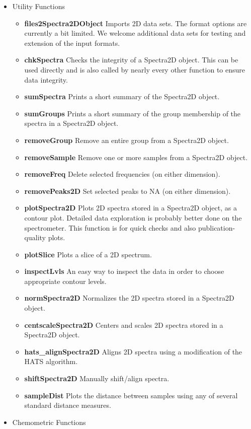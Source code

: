 \documentclass[10pt,twocolumn,twoside,]{pinp}
\providecommand{\tightlist}{%
  \setlength{\itemsep}{0pt}\setlength{\parskip}{0pt}}
\begin{document}
\begin{itemize}
\tightlist
\item
  Utility Functions

  \begin{itemize}
  \tightlist
  \item
    \textbf{files2Spectra2DObject} Imports 2D data sets. The format
    options are currently a bit limited. We welcome additional data sets
    for testing and extension of the input formats.
  \item
    \textbf{chkSpectra} Checks the integrity of a Spectra2D object. This
    can be used directly and is also called by nearly every other
    function to ensure data integrity.
  \item
    \textbf{sumSpectra} Prints a short summary of the Spectra2D object.
  \item
    \textbf{sumGroups} Prints a short summary of the group membership of
    the spectra in a Spectra2D object.
  \item
    \textbf{removeGroup} Remove an entire group from a Spectra2D object.
  \item
    \textbf{removeSample} Remove one or more samples from a Spectra2D
    object.
  \item
    \textbf{removeFreq} Delete selected frequencies (on either
    dimension).
  \item
    \textbf{removePeaks2D} Set selected peaks to NA (on either
    dimension).
  \item
    \textbf{plotSpectra2D} Plots 2D spectra stored in a Spectra2D
    object, as a contour plot. Detailed data exploration is probably
    better done on the spectrometer. This function is for quick checks
    and also publication-quality plots.
  \item
    \textbf{plotSlice} Plots a slice of a 2D spectrum.
  \item
    \textbf{inspectLvls} An easy way to inspect the data in order to
    choose appropriate contour levels.
  \item
    \textbf{normSpectra2D} Normalizes the 2D spectra stored in a
    Spectra2D object.
  \item
    \textbf{centscaleSpectra2D} Centers and scales 2D spectra stored in
    a Spectra2D object.
  \item
    \textbf{hats\_alignSpectra2D} Aligns 2D spectra using a modification
    of the HATS algorithm.
  \item
    \textbf{shiftSpectra2D} Manually shift/align spectra.
  \item
    \textbf{sampleDist} Plots the distance between samples using any of
    several standard distance measures.
  \end{itemize}
\item
  Chemometric Functions


\end{itemize}
\end{document}
